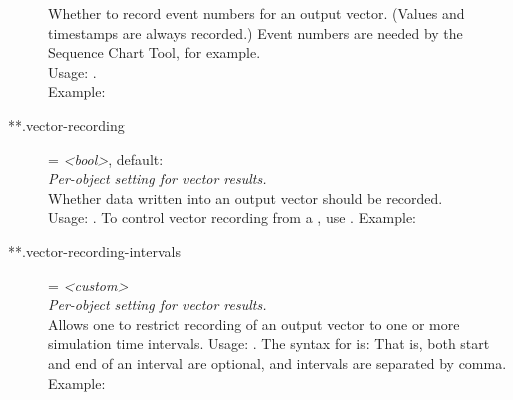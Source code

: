 \begin{description}
    Whether to record event numbers for an output vector. (Values and
    timestamps are always recorded.) Event numbers are needed by the Sequence
    Chart Tool, for example.\\
    Usage:
    .\\
    Example:
\item[**.vector-recording] = \textit{<bool>}, default: \\
    \textit{Per-object setting for vector results.}\\
    Whether data written into an output vector should be recorded.\\
    Usage:
    .
    To control vector recording from a , use
    . Example:
\item[**.vector-recording-intervals] = \textit{<custom>}\\
    \textit{Per-object setting for vector results.}\\
    Allows one to restrict recording of an output vector to one or more
    simulation time intervals. Usage:
    .
    The syntax for  is:
     That is,
    both start and end of an interval are optional, and intervals are separated
    by comma.\\
    Example:

\end{description}
